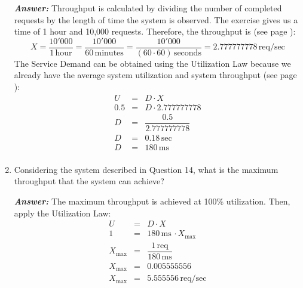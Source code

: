 \begin{enumerate}
    \textcolor{Green3}{\emph{\textbf{Answer:}}} Throughput is calculated by dividing the number of completed requests by the length of time the system is observed. The exercise gives us a time of 1 hour and 10,000 requests. Therefore, the throughput is (see page \pageref{eq: Throughput}):
    \begin{equation*}
        X = \dfrac{10'000}{1 \, \text{hour}} = \dfrac{10'000}{60 \, \text{minutes}} = \dfrac{10'000}{\left(60 \cdot 60\right)\, \text{seconds}} = 2.777777778 \, \text{req/sec}
    \end{equation*}
    The Service Demand can be obtained using the Utilization Law because we already have the average system utilization and system throughput (see page \pageref{eq: Utilization Law with Service Demand}):
    \begin{equation*}
        \begin{array}{rcl}
            U   &=& D \cdot X \\ [.3em]
            0.5 &=& D \cdot 2.777777778 \\ [.4em]
            D   &=& \dfrac{0.5}{2.777777778} \\ [1em]
            D   &=& 0.18 \, \text{sec} \\ [.3em]
            D   &=& 180 \, \text{ms} \\
        \end{array}
    \end{equation*}

    \item Considering the system described in Question 14, what is the maximum throughput that the system can achieve?
    
    \textcolor{Green3}{\emph{\textbf{Answer:}}} The maximum throughput is achieved at 100\% utilization. Then, apply the Utilization Law:
    \begin{equation*}
        \begin{array}{rcl}
            U &=& D \cdot X \\ [.3em]
            1 &=& 180 \, \text{ms} \, \cdot X_{\max} \\ [.4em]
            X_{\max} &=& \dfrac{1 \, \text{req}}{180 \, \text{ms}} \\ [1em]
            X_{\max} &=& 0.005555556 \\ [.3em]
            X_{\max} &=& 5.555556 \, \text{req/sec}
        \end{array}
    \end{equation*}

    \newpage


\end{enumerate}
